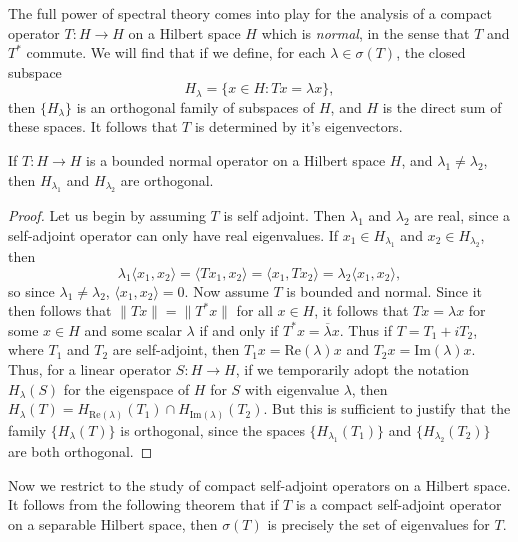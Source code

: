 The full power of spectral theory comes into play for the analysis of a compact operator $T: H \to H$ on a Hilbert space $H$ which is \emph{normal}, in the sense that $T$ and $T^*$ commute. We will find that if we define, for each $\lambda \in \sigma(T)$, the closed subspace
%
\[ H_\lambda = \{ x \in H: Tx = \lambda x \}, \]
%
then $\{ H_\lambda \}$ is an orthogonal family of subspaces of $H$, and $H$ is the direct sum of these spaces. It follows that $T$ is determined by it's eigenvectors.

\begin{lemma}
    If $T: H \to H$ is a bounded normal operator on a Hilbert space $H$, and $\lambda_1 \neq \lambda_2$, then $H_{\lambda_1}$ and $H_{\lambda_2}$ are orthogonal.
\end{lemma}
\begin{proof}
    Let us begin by assuming $T$ is self adjoint. Then $\lambda_1$ and $\lambda_2$ are real, since a self-adjoint operator can only have real eigenvalues. If $x_1 \in H_{\lambda_1}$ and $x_2 \in H_{\lambda_2}$, then
    \[ \lambda_1 \langle x_1, x_2 \rangle = \langle Tx_1, x_2 \rangle = \langle x_1, Tx_2 \rangle = \lambda_2 \langle x_1, x_2 \rangle, \]
    so since $\lambda_1 \neq \lambda_2$, $\langle x_1, x_2 \rangle = 0$. Now assume $T$ is bounded and normal. Since it then follows that $\| Tx \| = \| T^* x \|$ for all $x \in H$, it follows that $Tx = \lambda x$ for some $x \in H$ and some scalar $\lambda$ if and only if $T^*x = \overline{\lambda} x$. Thus if $T = T_1 + i T_2$, where $T_1$ and $T_2$ are self-adjoint, then $T_1 x = \text{Re}(\lambda) x$ and $T_2 x = \text{Im}(\lambda) x$. Thus, for a linear operator $S: H \to H$, if we temporarily adopt the notation $H_\lambda(S)$ for the eigenspace of $H$ for $S$ with eigenvalue $\lambda$, then $H_\lambda(T) = H_{\text{Re}(\lambda)}(T_1) \cap H_{\text{Im}(\lambda)}(T_2)$. But this is sufficient to justify that the family $\{ H_\lambda(T) \}$ is orthogonal, since the spaces $\{ H_{\lambda_1}(T_1) \}$ and $\{ H_{\lambda_2}(T_2) \}$ are both orthogonal.
\end{proof}

Now we restrict to the study of compact self-adjoint operators on a Hilbert space. It follows from the following theorem that if $T$ is a compact self-adjoint operator on a separable Hilbert space, then $\sigma(T)$ is precisely the set of eigenvalues for $T$.

